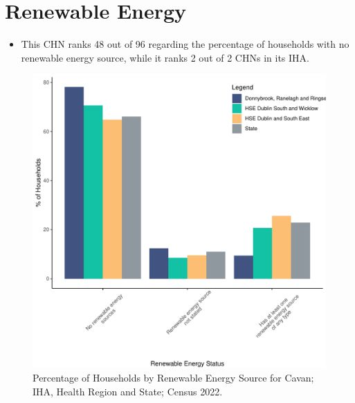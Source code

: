 \documentclass{article}
\begin{document}
\section{Renewable Energy}\label{sect:RE}
\begin{itemize}
\item This CHN ranks  48 out of 96 regarding the percentage of households with no renewable energy source, while it ranks   2 out of 2 CHNs in its IHA.
\end{itemize}
\begin{figure}[H]
	\centering
	\includegraphics[width = 140mm]{../figures/RenewableEnergyED.pdf}
	\caption{Percentage of Households by Renewable Energy Source for Cavan; IHA, Health Region and State; Census 2022.}
	\label{fig:vbnv}
	\end{figure}
\end{document}
